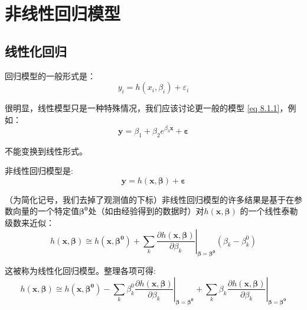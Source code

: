 
\chapter{非线性回归模型}

\section{线性化回归}

回归模型的一般形式是：
\begin{equation}
       y_{i}=h\left(x_{i}, \beta_{i} \right)+\varepsilon_{i}
       \label{eq 8.1.1}
\end{equation}

很明显，线性模型只是一种特殊情况，我们应该讨论更一般的模型 \ref{eq 8.1.1}，例如：
\begin{equation}
     \boldsymbol{y} = \beta_{1}+\beta_{2} e^{\beta_{3} \boldsymbol{x} }+\boldsymbol{\varepsilon}
    \label{eq 8.1.2}
\end{equation}

不能变换到线性形式。

非线性回归模型是:
$$ \boldsymbol{y} = h(\boldsymbol{x}, \boldsymbol{\beta}) + \boldsymbol{\varepsilon} $$

（为简化记号，我们去掉了观测值的下标）非线性回归模型的许多结果是基于在参数向量的一个特定值$ \boldsymbol{\beta^{0}} $处（如由经验得到的数据时）对$h(\boldsymbol{x, \beta})$ 的一个线性泰勒级数来近似：
\begin{equation}
   h(\boldsymbol{x, \beta}) \cong h\left(\boldsymbol{x, \beta^{0}}\right)+\left.\sum_{k} 
   \frac{\partial h(\boldsymbol{x, \beta})}{\partial \beta_{k}}\right|_{\boldsymbol{\beta=\beta^{0}}}
     \left(\beta_{k}-\beta_{k}^{0}\right) 
\end{equation}

这被称为线性化回归模型。整理各项可得:
$$ h(\boldsymbol{x, \beta}) \cong h\left(\boldsymbol{x}, \boldsymbol{\beta^{0}}\right)-\left.\sum_{k} \beta_{k}^{0} 
    \frac{\partial h(\boldsymbol{x, \beta})}{\partial \beta_{k}}\right|_{\boldsymbol{\beta=\beta^{0}}}+\left.\sum_{k} \beta_{k} 
    \frac{\partial h(\boldsymbol{x, \beta})}{\partial \beta_{k}}\right|_{\boldsymbol{\beta=\beta^{0}}} $$


